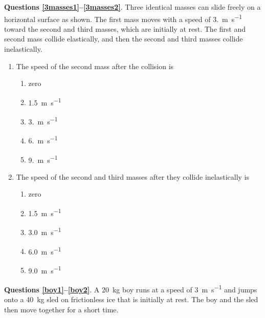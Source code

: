 \documentclass{../../../oss-apphys}
\begin{document}
\begin{multicols*}{2}
  \textbf{Questions \ref{3masses1}--\ref{3masses2}}. Three identical masses can
  slide freely on a horizontal surface as shown. The first mass moves with a
  speed of \SI{3.}{\metre\per\second} toward the second and third masses, which
  are initially at rest. The first and second mass collide elastically, and
  then the second and third masses collide inelastically.
  \begin{center}
  \end{center}
  \begin{enumerate}[leftmargin=18pt,resume]
  \item The speed of the second mass after the collision is
    \label{3masses1}
    \begin{enumerate}[nosep,leftmargin=18pt,label=(\Alph*)]
    \item zero
    \item\SI{1.5}{\metre\per\second}
    \item\SI{3.}{\metre\per\second}
    \item\SI{6.}{\metre\per\second}
    \item\SI{9.}{\metre\per\second}
    \end{enumerate}

  \item The speed of the second and third masses after they collide
    inelastically is
    \label{3masses2}
    \begin{enumerate}[nosep,leftmargin=18pt,label=(\Alph*)]
    \item zero
    \item\SI{1.5}{\metre\per\second}
    \item\SI{3.0}{\metre\per\second}
    \item\SI{6.0}{\metre\per\second}
    \item\SI{9.0}{\metre\per\second}
    \end{enumerate}
  \end{enumerate}

  \textbf{Questions \ref{boy1}--\ref{boy2}}. A \SI{20}{\kilo\gram} boy runs at
  a speed of \SI{3}{\metre\per\second} and jumps onto a \SI{40}{\kilo\gram}
  sled on frictionless ice that is initially at rest. The boy and the sled then
  move together for a short time.


\end{multicols*}
\end{document}
